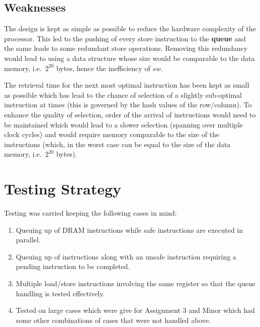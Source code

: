 \documentclass{article}
\begin{document}
\subsection{Weaknesses}
The design is kept as simple as possible to reduce the hardware complexity of the processor. This led to the pushing of every store instruction to the \textbf{queue} and the same leads to some redundant store operations. Removing this redundancy would lead to using a data structure whose size would be comparable to the data memory, i.e.\ $2^{20}$ bytes, hence the inefficiency of $sw$.\par
The retrieval time for the next most optimal instruction has been kept as small as possible which has lead to the chance of selection of a slightly sub-optimal instruction at times (this is governed by the hash values of the row/column). To enhance the quality of selection, order of the arrival of instructions would need to be maintained which would lead to a slower selection (spanning over multiple clock cycles) and would require memory comparable to the size of the instructions (which, in the worst case can be equal to the size of the data memory, i.e.\ $2^{20}$ bytes).



\section{Testing Strategy}

Testing was carried keeping the following cases in mind:
\begin{enumerate}
    \item Queuing up of DRAM instructions while safe instructions are executed in parallel.
    \item Queuing up of instructions along with an unsafe instruction requiring a pending instruction to be completed.
    \item Multiple load/store instructions involving the same register so that the queue handling is tested effectively.
    \item Tested on large cases which were give for Assignment 3 and Minor which had some other combinations of cases that were not handled above.
\end{enumerate}
\end{document}
